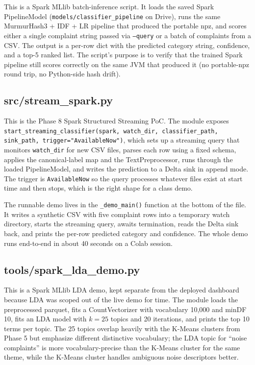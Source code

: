 \documentclass[11pt,letterpaper]{book}
\begin{document}
This is a Spark MLlib batch-inference script. It loads the saved Spark PipelineModel (\texttt{models/classifier\_pipeline} on Drive), runs the same MurmurHash3 + IDF + LR pipeline that produced the portable npz, and scores either a single complaint string passed via \texttt{--query} or a batch of complaints from a CSV. The output is a per-row dict with the predicted category string, confidence, and a top-5 ranked list. The script's purpose is to verify that the trained Spark pipeline still scores correctly on the same JVM that produced it (no portable-npz round trip, no Python-side hash drift).

\subsection*{src/stream\_spark.py}

This is the Phase 8 Spark Structured Streaming PoC. The module exposes \texttt{start\_streaming\_classifier(spark, watch\_dir, classifier\_path, sink\_path, trigger="AvailableNow")}, which sets up a streaming query that monitors \texttt{watch\_dir} for new CSV files, parses each row using a fixed schema, applies the canonical-label map and the TextPreprocessor, runs through the loaded PipelineModel, and writes the prediction to a Delta sink in append mode. The trigger is \texttt{AvailableNow} so the query processes whatever files exist at start time and then stops, which is the right shape for a class demo.

The runnable demo lives in the \texttt{\_demo\_main()} function at the bottom of the file. It writes a synthetic CSV with five complaint rows into a temporary watch directory, starts the streaming query, awaits termination, reads the Delta sink back, and prints the per-row predicted category and confidence. The whole demo runs end-to-end in about 40 seconds on a Colab session.

\subsection*{tools/spark\_lda\_demo.py}

This is a Spark MLlib LDA demo, kept separate from the deployed dashboard because LDA was scoped out of the live demo for time. The module loads the preprocessed parquet, fits a CountVectorizer with vocabulary 10,000 and minDF 10, fits an LDA model with $k = 25$ topics and 20 iterations, and prints the top 10 terms per topic. The 25 topics overlap heavily with the K-Means clusters from Phase 5 but emphasize different distinctive vocabulary; the LDA topic for ``noise complaints'' is more vocabulary-precise than the K-Means cluster for the same theme, while the K-Means cluster handles ambiguous noise descriptors better.
\end{document}
